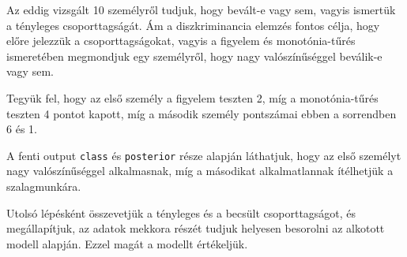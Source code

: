 \documentclass[
  letterpaper,
]{krantz}
\makeatletter
\newenvironment{Shaded}{\begin{snugshade}}{\end{snugshade}}
\newcommand{\AttributeTok}[1]{\textcolor[rgb]{0.40,0.45,0.13}{#1}}
\newcommand{\CommentTok}[1]{\textcolor[rgb]{0.37,0.37,0.37}{#1}}
\newcommand{\DecValTok}[1]{\textcolor[rgb]{0.68,0.00,0.00}{#1}}
\newcommand{\FunctionTok}[1]{\textcolor[rgb]{0.28,0.35,0.67}{#1}}
\newcommand{\NormalTok}[1]{\textcolor[rgb]{0.00,0.23,0.31}{#1}}
\newcommand{\OtherTok}[1]{\textcolor[rgb]{0.00,0.23,0.31}{#1}}
\newcommand{\SpecialCharTok}[1]{\textcolor[rgb]{0.37,0.37,0.37}{#1}}
\newcommand{\StringTok}[1]{\textcolor[rgb]{0.13,0.47,0.30}{#1}}
\newenvironment{kframe}{%
\medskip{}
\setlength{\fboxsep}{.8em}
 \def\at@end@of@kframe{}%
 \ifinner\ifhmode%
  \def\at@end@of@kframe{\end{minipage}}%
  \begin{minipage}{\columnwidth}%
 \fi\fi%
 \def\FrameCommand##1{\hskip\@totalleftmargin \hskip-\fboxsep
 \colorbox{shadecolor}{##1}\hskip-\fboxsep
     \hskip-\linewidth \hskip-\@totalleftmargin \hskip\columnwidth}%
 \MakeFramed {\advance\hsize-\width
   \@totalleftmargin\z@ \linewidth\hsize
   \@setminipage}}%
 {\par\unskip\endMakeFramed%
 \at@end@of@kframe}
\renewenvironment{Shaded}{\begin{kframe}}{\end{kframe}}
\makeatother
\begin{document}
Az eddig vizsgált 10 személyről tudjuk, hogy bevált-e vagy sem, vagyis
ismertük a tényleges csoporttagságát. Ám a diszkriminancia elemzés
fontos célja, hogy előre jelezzük a csoporttagságokat, vagyis a figyelem
és monotónia-tűrés ismeretében megmondjuk egy személyről, hogy nagy
valószínűséggel beválik-e vagy sem.

Tegyük fel, hogy az első személy a figyelem teszten 2, míg a
monotónia-tűrés teszten 4 pontot kapott, míg a második személy
pontszámai ebben a sorrendben 6 és 1.

\begin{Shaded}
\end{Shaded}

A fenti output \texttt{class} és \texttt{posterior} része alapján
láthatjuk, hogy az első személyt nagy valószínűséggel alkalmasnak, míg a
másodikat alkalmatlannak ítélhetjük a szalagmunkára.

Utolsó lépésként összevetjük a tényleges és a becsült csoporttagságot,
és megállapítjuk, az adatok mekkora részét tudjuk helyesen besorolni az
alkotott modell alapján. Ezzel magát a modellt értékeljük.

\begin{Shaded}
\end{Shaded}
\end{document}
